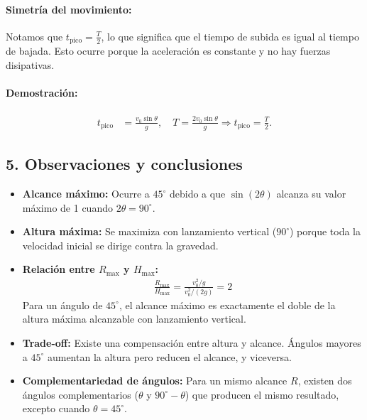 \documentclass[12pt,a4paper]{article}
\begin{document}
\paragraph{Simetría del movimiento:} Notamos que $t_{\text{pico}} = \frac{T}{2}$, lo que significa que el tiempo de subida es igual al tiempo de bajada. Esto ocurre porque la aceleración es constante y no hay fuerzas disipativas.

\paragraph{Demostración:}
\begin{align*}
t_{\text{pico}} &= \frac{v_0 \sin\theta}{g}, \quad T = \frac{2 v_0 \sin\theta}{g} \Rightarrow t_{\text{pico}} = \frac{T}{2}.
\end{align*}

\subsection*{5. Observaciones y conclusiones}

\begin{itemize}
\item \textbf{Alcance máximo:} Ocurre a $45^\circ$ debido a que $\sin(2\theta)$ alcanza su valor máximo de 1 cuando $2\theta = 90^\circ$.

\item \textbf{Altura máxima:} Se maximiza con lanzamiento vertical ($90^\circ$) porque toda la velocidad inicial se dirige contra la gravedad.

\item \textbf{Relación entre $R_{\max}$ y $H_{\max}$:} 
\begin{align*}
\frac{R_{\max}}{H_{\max}} = \frac{v_0^2/g}{v_0^2/(2g)} = 2
\end{align*}
Para un ángulo de $45^\circ$, el alcance máximo es exactamente el doble de la altura máxima alcanzable con lanzamiento vertical.

\item \textbf{Trade-off:} Existe una compensación entre altura y alcance. Ángulos mayores a $45^\circ$ aumentan la altura pero reducen el alcance, y viceversa.

\item \textbf{Complementariedad de ángulos:} Para un mismo alcance $R$, existen dos ángulos complementarios ($\theta$ y $90^\circ-\theta$) que producen el mismo resultado, excepto cuando $\theta = 45^\circ$.
\end{itemize}
\end{document}
